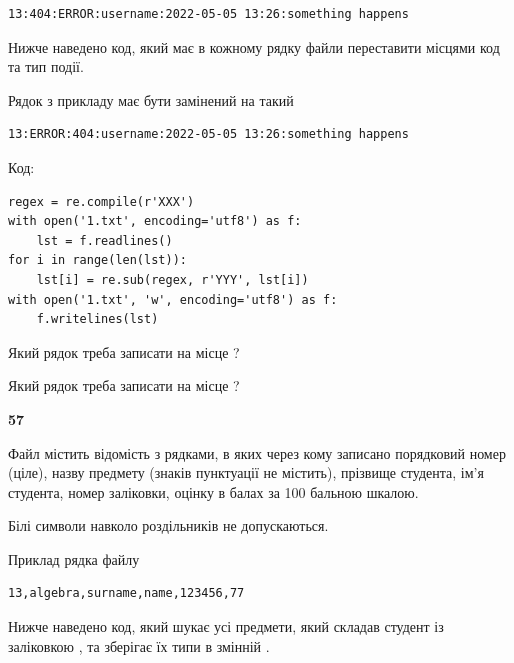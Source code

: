 \begin{verbatim}
13:404:ERROR:username:2022-05-05 13:26:something happens
\end{verbatim}


Нижче наведено код, який має в кожному рядку файли переставити місцями код та тип події.

Рядок з прикладу має бути замінений на такий



\begin{verbatim}
13:ERROR:404:username:2022-05-05 13:26:something happens
\end{verbatim}




Код:



\begin{verbatim}
regex = re.compile(r'XXX')
with open('1.txt', encoding='utf8') as f:
    lst = f.readlines()
for i in range(len(lst)):
    lst[i] = re.sub(regex, r'YYY', lst[i])
with open('1.txt', 'w', encoding='utf8') as f:
    f.writelines(lst)
\end{verbatim}







Який рядок треба записати на місце  ?\par
\vspace{5mm}


Який рядок треба записати на місце  ?\par


\newpage

{\begin {center}\textbf{ 57}\end {center}}\par
Файл  містить відомість з рядками, в яких через кому записано поряд\-ковий номер (ціле), назву предмету (знаків пунктуації не містить), прізвище студента, ім'я студента, номер заліковки, оцінку в балах за 100 бальною шкалою.

Білі символи навколо роздільників не допускаються.

Приклад рядка файлу



\begin{verbatim}
13,algebra,surname,name,123456,77
\end{verbatim}


Нижче наведено код, який шукає усі предмети, який складав студент із заліковкою , та зберігає їх типи в змінній .



